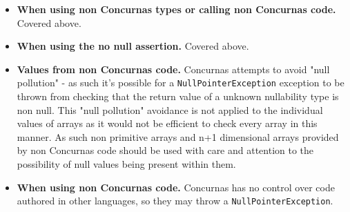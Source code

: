 \documentclass[conc-doc]{subfiles}
\begin{document}
\begin{itemize}
	\item \textbf{When using non Concurnas types or calling non Concurnas code.} Covered above.
	\item \textbf{When using the no null assertion.} Covered above.
	\item \textbf{Values from non Concurnas code.} Concurnas attempts to avoid "null pollution" - as such it's possible for a \lstinline{NullPointerException} exception to be thrown from checking that the return value of a unknown nullability type is non null. This "null pollution" avoidance is not applied to the individual values of arrays as it would not be efficient to check every array in this manner. As such non primitive arrays and n+1 dimensional arrays provided by non Concurnas code should be used with care and attention to the possibility of null values being present within them.
	\item \textbf{When using non Concurnas code.} Concurnas has no control over code authored in other languages, so they may throw a \lstinline{NullPointerException}.
\end{itemize}
\end{document}
